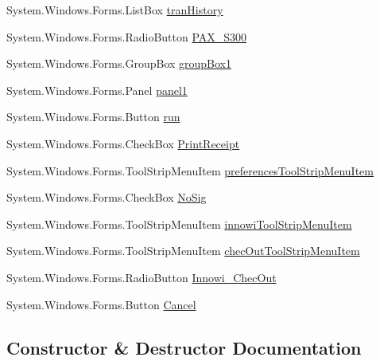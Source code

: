 \begin{DoxyCompactItemize}
System.\+Windows.\+Forms.\+List\+Box \mbox{\hyperlink{class_cert_complete_1_1_cert_complete_a3d2276274977225d308b5eb6195e4da7}{tran\+History}}
\item 
System.\+Windows.\+Forms.\+Radio\+Button \mbox{\hyperlink{class_cert_complete_1_1_cert_complete_a4e90f2e4b3d0c471d47e482dc6657db8}{P\+A\+X\+\_\+\+S300}}
\item 
System.\+Windows.\+Forms.\+Group\+Box \mbox{\hyperlink{class_cert_complete_1_1_cert_complete_ae14932068d3be5c2e99ae3b1fe88a9d4}{group\+Box1}}
\item 
System.\+Windows.\+Forms.\+Panel \mbox{\hyperlink{class_cert_complete_1_1_cert_complete_a92cad43818b4e7f496378be9e785202d}{panel1}}
\item 
System.\+Windows.\+Forms.\+Button \mbox{\hyperlink{class_cert_complete_1_1_cert_complete_a027a03bc6f41269be77b5744b346cbd6}{run}}
\item 
System.\+Windows.\+Forms.\+Check\+Box \mbox{\hyperlink{class_cert_complete_1_1_cert_complete_aa4d58d6977809cef2216480e619a13d9}{Print\+Receipt}}
\item 
System.\+Windows.\+Forms.\+Tool\+Strip\+Menu\+Item \mbox{\hyperlink{class_cert_complete_1_1_cert_complete_a925b71e3f63e4616655e8cee3e1f57ad}{preferences\+Tool\+Strip\+Menu\+Item}}
\item 
System.\+Windows.\+Forms.\+Check\+Box \mbox{\hyperlink{class_cert_complete_1_1_cert_complete_a3e10741e6e8e5b596bfd906e2c019095}{No\+Sig}}
\item 
System.\+Windows.\+Forms.\+Tool\+Strip\+Menu\+Item \mbox{\hyperlink{class_cert_complete_1_1_cert_complete_a18ae691771ff00c5f54a317ba0d33cff}{innowi\+Tool\+Strip\+Menu\+Item}}
\item 
System.\+Windows.\+Forms.\+Tool\+Strip\+Menu\+Item \mbox{\hyperlink{class_cert_complete_1_1_cert_complete_a12b8a2dc095fdab7219eaa010d583dfa}{chec\+Out\+Tool\+Strip\+Menu\+Item}}
\item 
System.\+Windows.\+Forms.\+Radio\+Button \mbox{\hyperlink{class_cert_complete_1_1_cert_complete_a0451827808baa78395a25f451356dee0}{Innowi\+\_\+\+Chec\+Out}}
\item 
System.\+Windows.\+Forms.\+Button \mbox{\hyperlink{class_cert_complete_1_1_cert_complete_ac41ab197a4da99aef6ba87b66f64dce1}{Cancel}}
\end{DoxyCompactItemize}


\subsection{Constructor \& Destructor Documentation}
\mbox{\label{class_cert_complete_1_1_cert_complete_aca2e4b4895fb938a23b6e056971e2a78}} 
